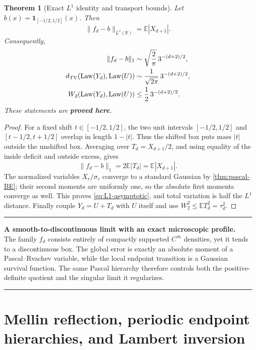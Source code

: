 \documentclass[11pt,oneside]{article}
\numberwithin{equation}{section}
\newtheorem{theorem}{Theorem}[section]
\theoremstyle{definition}
\theoremstyle{remark}
\newcommand{\R}{\mathbb R}
\newcommand{\E}{\mathbb E}
\newcommand{\Law}{\operatorname{Law}}
\newcommand{\statusproved}{\textcolor{deepgreen}{\textbf{proved here}}}
\newenvironment{resultbox}[1]{%
  \par\medskip\noindent\begin{center}\begin{minipage}{0.94\textwidth}%
  \color{deepgreen}\hrule\vspace{0.65em}%
  \color{black}\textbf{\color{deepgreen}#1.}\ }{%
  \par\vspace{0.65em}\color{deepgreen}\hrule
  \end{minipage}\end{center}\medskip}
\begin{document}
\begin{theorem}[Exact $L^1$ identity and transport bounds]
\label{thm:global-box-distance}
Let $b(x)=\mathbf1_{[-1/2,1/2]}(x)$.  Then
\begin{equation}
 \boxed{
 \|f_d-b\|_{L^1(\R)}
 =\E|X_{d+1}|.}
 \label{eq:L1-exact}
\end{equation}
Consequently,
\begin{align}
 \|f_d-b\|_1
 &\sim\sqrt{\frac2\pi}\,3^{-(d+2)/2},
 \label{eq:L1-asymptotic}\\
 d_{\rm TV}(\Law(Y_d),\Law(U))
 &\sim\frac1{\sqrt{2\pi}}\,3^{-(d+2)/2},
 \label{eq:TV-asymptotic}\\
 W_2(\Law(Y_d),\Law(U))
 &\le\frac12\,3^{-(d+2)/2}.
 \label{eq:W2-bound}
\end{align}
These statements are \statusproved.
\end{theorem}

\begin{proof}
For a fixed shift $t\in[-1/2,1/2]$, the two unit intervals
$[-1/2,1/2]$ and $[t-1/2,t+1/2]$ overlap in length $1-|t|$.  Thus the shifted box puts mass
$|t|$ outside the unshifted box.  Averaging over $T_d=X_{d+1}/2$, and using equality of the
inside deficit and outside excess, gives
\[
 \|f_d-b\|_1=2\E|T_d|=\E|X_{d+1}|.
\]
The normalized variables $X_r/\sigma_r$ converge to a standard Gaussian by
\cref{thm:pascal-BE}; their second moments are uniformly one, so the absolute first moments
converge as well.  This proves \eqref{eq:L1-asymptotic}, and total variation is half the
$L^1$ distance.  Finally couple $Y_d=U+T_d$ with $U$ itself and use
$W_2^2\le\E T_d^2=\tau_d^2$.
\end{proof}

\begin{resultbox}{A smooth-to-discontinuous limit with an exact microscopic profile}
The family $f_d$ consists entirely of compactly supported $C^\infty$ densities, yet it tends
to a discontinuous box.  The global error is exactly an absolute moment of a Pascal--Rvachev
variable, while the local endpoint transition is a Gaussian survival function.  The same
Pascal hierarchy therefore controls both the positive-definite quotient and the singular
limit it regularizes.
\end{resultbox}


\section{Mellin reflection, periodic endpoint hierarchies, and Lambert inversion}
\label{sec:mellin}
\end{document}
